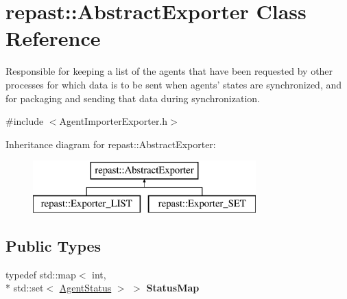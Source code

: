 \hypertarget{classrepast_1_1_abstract_exporter}{\section{repast\-:\-:Abstract\-Exporter Class Reference}
\label{classrepast_1_1_abstract_exporter}
}


Responsible for keeping a list of the agents that have been requested by other processes for which data is to be sent when agents' states are synchronized, and for packaging and sending that data during synchronization.  




{\ttfamily \#include $<$Agent\-Importer\-Exporter.\-h$>$}

Inheritance diagram for repast\-:\-:Abstract\-Exporter\-:\begin{figure}[H]
\begin{center}
\leavevmode
\includegraphics[height=2.000000cm]{classrepast_1_1_abstract_exporter}
\end{center}
\end{figure}
\subsection*{Public Types}
\begin{DoxyCompactItemize}
\item 
\hypertarget{classrepast_1_1_abstract_exporter_a128bcef08654b7749e5fc3d5fc4529ec}{typedef std\-::map$<$ int, \\*
std\-::set$<$ \hyperlink{classrepast_1_1_agent_status}{Agent\-Status} $>$ $>$ {\bfseries Status\-Map}}\label{classrepast_1_1_abstract_exporter_a128bcef08654b7749e5fc3d5fc4529ec}

\end{DoxyCompactItemize}
